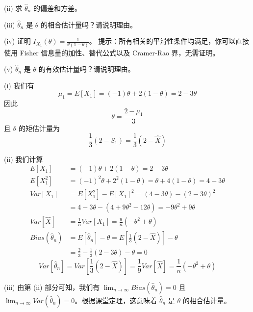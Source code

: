 \begin{questions}
(ii) 求 $\hat{\theta}_n$ 的偏差和方差。

(iii) $\hat{\theta}_n$ 是 $\theta$ 的相合估计量吗？请说明理由。

(iv) 证明 $I_{X_1}(\theta) = \frac{1}{\theta(1 - \theta)}$。
提示：所有相关的平滑性条件均满足，你可以直接使用 Fisher 信息量的加性、替代公式以及 Cramer-Rao 界，无需证明。

(v) $\hat{\theta}_n$ 是 $\theta$ 的有效估计量吗？请说明理由。

\begin{solution}
(i) 我们有
\[
\mu_1 = E[X_1] = (-1)\theta + 2(1 - \theta) = 2 - 3\theta
\]
因此
\[
\theta = \frac{2 - \mu_1}{3}
\]
且 $\theta$ 的矩估计量为
\[
\frac{1}{3}(2 - S_1) = \frac{1}{3}(2 - \hat{X})
\]

(ii) 我们计算
\begin{align*}
E[X_1] &= (-1)\theta + 2(1 - \theta) = 2 - 3\theta\\
E[X_1^2] &= (-1)^2\theta + 2^2(1 - \theta) = \theta + 4(1 - \theta) = 4 - 3\theta\\
Var[X_1] &= E[X_1^2] - E[X_1]^2 = (4 - 3\theta) - (2 - 3\theta)^2\\
&= 4 - 3\theta - (4 + 9\theta^2 - 12\theta) = -9\theta^2 + 9\theta\\
Var[\hat{X}] &= \frac{1}{n} Var[X_1] = \frac{9}{n}(-\theta^2 + \theta)\\
Bias(\hat{\theta}_n) &= E[\hat{\theta}_n] - \theta = E\left[\frac{1}{3}(2 - \hat{X})\right] - \theta\\
&= \frac{2}{3} - \frac{1}{3}(2 - 3\theta) - \theta = 0
\end{align*}
\[
Var[\hat{\theta}_n] = Var\left[\frac{1}{3}(2 - \hat{X})\right] = \frac{1}{9} Var[\hat{X}] = \frac{1}{n}(-\theta^2 + \theta)
\]

(iii) 由第 (ii) 部分可知，我们有 $\lim_{n \to \infty} Bias(\hat{\theta}_n) = 0$ 且 $\lim_{n \to \infty} Var(\hat{\theta}_n) = 0$。根据课堂定理，这意味着 $\hat{\theta}_n$ 是 $\theta$ 的相合估计量。


\end{solution}
\end{questions}
